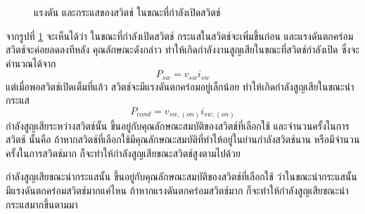 \documentclass[11pt,a4paper]{article}
\begin{document}
\begin{figure}[h]
    \begin{center}
    \end{center}
    \caption{แรงดัน และกระแสของสวิตช์ ในขณะที่กำลังเปิดสวิตช์}
    \label{switchloss}
\end{figure}

จากรูปที่ \ref{switchloss} จะเห็นได้ว่า ในขณะที่กำลังเปิดสวิตช์ กระแสในสวิตช์จะเพิ่มขึ้นก่อน และแรงดันตกคร่อมสวิตช์จะค่อยลดลงทีหลัง คุณลักษณะดังกล่าว ทำให้เกิดกำลังงานสูญเสียในขณะที่สวิตช์กำลังเปิด ซึ่งจะคำนวณได้จาก
\begin{equation*}
    P_{sw} = v_{sw}i_{sw}
\end{equation*}
แต่เมื่อพอสวิตช์เปิดเต็มที่แล้ว สวิตช์จะมีแรงดันตกคร่อมอยู่เล็กน้อย ทำให้เกิดกำลังสูญเสียในขณะนำกระแส
\begin{equation*}
    P_{cond} = v_{sw,(on)}i_{sw,(on)}
\end{equation*}
กำลังสูญเสียระหว่างสวิตช์นั้น ขึ้นอยู่กับคุณลักษณะสมบัติของสวิตช์ที่เลือกใช้ และจำนวนครั้งในการสวิตช์ นั้นคือ ถ้าหากสวิตช์ที่เลือกใช้มีคุณลักษณะสมบัติที่ทำให้อยู่ในย่านกำลังสวิตช์นาน หรือมีจำนวนครั้งในการสวิตช์มาก ก็จะทำให้กำลังสูญเสียขณะสวิตช์สูงตามไปด้วย

กำลังสูญเสียขณะนำกระแสนั้น ขึ้นอยู่กับคุณลักษณะสมบัติของสวิตช์ที่เลือกใช้ ว่าในขณะนำกระแสนั้นมีแรงดันตกคร่อมสวิตช์มากแค่ไหน ถ้าหากแรงดันตกคร่อมสวิตช์มาก ก็จะทำให้กำลังสูญเสียขณะนำกระแสมากขึ้นตามมา
\end{document}
